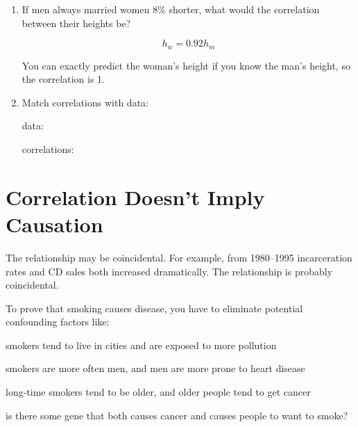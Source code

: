 \documentclass[landscape]{exam}
\begin{document}
\begin{enumerate}
\begin{solution}
      \end{solution}

    \item If men always married women 8\% shorter, what would the correlation
      between their heights be?
      \begin{solution}
        \[
          h_w = 0.92 h_m 
        \]

        You can exactly predict the woman's height if you know the man's
        height, so the correlation is 1.

      \end{solution}

    \item Match correlations with data:

      data:

      correlations:

  \end{enumerate}

  \section{Correlation Doesn't Imply Causation}  

  The relationship may be coincidental.  For example, from 1980--1995
  incarceration rates and CD sales both increased dramatically.  The
  relationship is probably coincidental.  

  To prove that smoking causes disease, you have to eliminate potential
  confounding factors like:
  \begin{itemize*}
    \item smokers tend to live in cities and are exposed to more pollution
    \item smokers are more often men, and men are more prone to heart disease
    \item long-time smokers tend to be older, and older people tend to get
      cancer
    \item is there some gene that both causes cancer and causes people to
      want to smoke?
  \end{itemize*}
\end{document}
